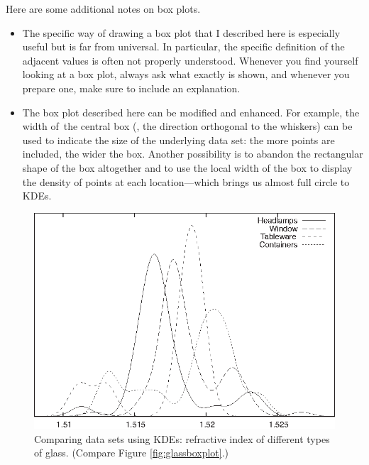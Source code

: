 Here are some additional notes on box plots.

\begin{itemize}
\item The specific way of drawing a box plot that I described here is
  especially useful but is far from universal. In particular, the
  specific definition of the adjacent values is often not properly
  understood. Whenever you find yourself looking at a box plot, always
  ask what exactly is shown, and whenever you prepare one, make sure
  to include an explanation.

\item The box plot described here can be modified and enhanced.  For
  example, the width of~the central box (\ie, the direction orthogonal
  to the whiskers) can be used to indicate the size of the underlying
  data set: the more points are included, the wider the box. Another
  possibility is to abandon the rectangular shape of the box
  altogether and to use the local width of the box to display the
  density of points at each location---\break which brings us almost full
  circle to KDEs.
\end{itemize}



\begin{figure}
  \centerline{\includegraphics{img/glass-kde}}
  \caption{Comparing data sets using KDEs: refractive index of different
    types of glass. (Compare Figure \ref{fig:glassboxplot}.)}
  \label{fig:glasskde}\vspace*{-6pt}
\end{figure} 

